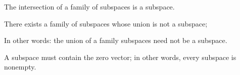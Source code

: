 \begin{proposition}
The intersection of a family of subspaces is a subspace.
\end{proposition}

\begin{proposition}
There exists a family of subspaces whose union is not a subspace;
\begin{remark}
In other words: the union of a family subspaces need not be a subspace.
\end{remark}

\end{proposition}

\begin{proposition}
A subspace must contain the zero vector; in other words, every subspace is nonempty.
\end{proposition}

\blankpage